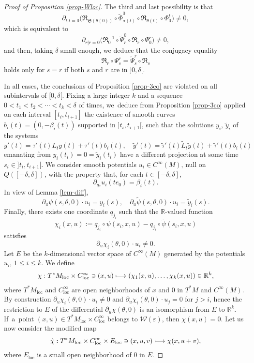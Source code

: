 \documentclass[JEP,XML,SOM,Unicode,published]{cedram}
\newcommand\mto{\mathchoice{\longmapsto}{\mapsto}{\mapsto}{\mapsto}}
\newcommand{\loc}{\mathrm{loc}}
\let\epsilon\varepsilon
\newcommand{\Rm}{\mathbb{R}}
\newcommand{\gR}{\ensuremath{\mathfrak{R}}}
\newcommand{\gS}{\ensuremath{\mathfrak{S}}}
\newcommand{\mW}{\ensuremath{\mathcal{W}}}
\theoremstyle{plain}
\theoremstyle{definition}
\begin{document}
\begin{proof}[Proof of Proposition \ref{prop-Wloc}]
The third and last possibility is that
\[
\partial_{t|t=0} \big(\gR_{\gS(\theta(0))}\circ\tilde \Phi_{\sigma(t)}^0\circ\gR_{\theta(t)}\circ \Phi_0^t\big) \neq 0,
\]
which is equivalent to
\[
\partial_{r|r=0} \big(\gR_0^{-1}\circ \tilde \Psi_r^0\circ\gR_{r}\circ \Psi_0^r\big) \neq 0,
\]
and then, taking $\delta$ small enough, we deduce that the
conjugacy equality
\[
\gR_{r}\circ \Psi_s^r= \tilde \Psi_s^r\circ \gR_{s}
\]
holds only for $s= r$ if both $s$ and $r$ are in $]0, \delta[$.

In all cases, the conclusions of Proposition \ref{prop-3co} are violated on all subintervals of $[0, \delta[$.
Fixing a large integer $k$ and a sequence $0<t_1< t_2 < \cdots <t_k<\delta$ of times, we~deduce from
Proposition \ref{prop-3co} applied on each interval $[t_i, t_{i+1}]$ the existence of smooth curves
$b_i(t)=(0, -\beta_i(t))$ supported in
$]t_i, t_{i+1}[$, such that the solutions $y_i$, $\tilde y_i$ of the systems
\[
y'(t)=\tau'(t)L_ty(t)+\tau'(t)b_i(t), \quad
\tilde y'(t)=\tilde \tau '(t)\tilde L_t\tilde y(t)+\tilde \tau'(t) b_i(t)
\]
emanating from $y_i(t_i)\!=\!0\!=\!\tilde y_i(t_i)$ have a different projection at some time $s_i\!\in\!{}]t_i, t_{i+1}[$.
We consider smooth potentials $u_i\in C^{\infty}(M)$, null on $Q([-\delta, \delta])$, with the property that,
for each $t\in [-\delta, \delta]$,
\[
\partial_{q_*} u_i(te_0)=\beta_i(t).
\]
In view of Lemma \ref{lem-diff},
\[
\partial_u \psi (s,\theta,0)\cdot u_i = y_i(s),\quad
\partial_u \tilde \psi (s,\theta,0)\cdot u_i = \tilde y_i(s).
\]
Finally, there exists one coordinate $q_{j_i}$ such that the $\Rm$-valued function
\[
\chi_i(x,u):=q_{j_i}\circ\psi(s_i,x,u)-q_{j_i}\circ \tilde \psi(s_i,x,u)
\]
satisfies
\[
\partial_u \chi_i(\theta,0)\cdot u_i \neq 0.
\]
Let $E$ be the $k$-dimensional vector space of $C^{\infty}(M)$ generated by the potentials $u_i$, $1\leq i \leq k$. We define
\[
\chi: T^*M_{\loc}\times C^{\infty}_{\loc}\ni(x,u)\mto (\chi_1(x,u), \ldots, \chi_k(x,u))\in \Rm^k,
\]
where $T^*M_{\loc}$ and $ C^{\infty}_{\loc}$ are open neighborhoods of $x$ and $0$ in $T^*M$ and $C^{\infty}(M)$.
By construction
$
\partial_u \chi_i(\theta,0)\cdot u_i \neq 0$
and
$
\partial_u \chi_i(\theta,0)\cdot u_j = 0$ for $j >i$, hence
the restriction to $E$ of the differential $\partial_u\chi (\theta,0)$ is an isomorphism from $E$ to $\Rm^k$.
If~a~point $(x,u)\in T^*M_{\loc}\times C^{\infty}_{\loc}$ belongs to $\mW(\epsilon)$, then $\chi(x,u)=0$.
Let us now consider the modified map
\[
\hat \chi:T^*M_{\loc}\times C^{\infty}_{\loc}\times E_{\loc} \ni (x,u,v)\mto \chi(x,u+v),
\]
where $E_{\loc}$ is a small open neighborhood of $0$ in $E$.

\end{proof}
\end{document}
